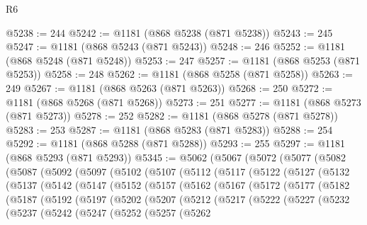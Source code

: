 \begin{lexlean}{R6}
\begin{coremodule}
@5238 := 244
@5242 := @1181 (@868 @5238 (@871 @5238))
@5243 := 245
@5247 := @1181 (@868 @5243 (@871 @5243))
@5248 := 246
@5252 := @1181 (@868 @5248 (@871 @5248))
@5253 := 247
@5257 := @1181 (@868 @5253 (@871 @5253))
@5258 := 248
@5262 := @1181 (@868 @5258 (@871 @5258))
@5263 := 249
@5267 := @1181 (@868 @5263 (@871 @5263))
@5268 := 250
@5272 := @1181 (@868 @5268 (@871 @5268))
@5273 := 251
@5277 := @1181 (@868 @5273 (@871 @5273))
@5278 := 252
@5282 := @1181 (@868 @5278 (@871 @5278))
@5283 := 253
@5287 := @1181 (@868 @5283 (@871 @5283))
@5288 := 254
@5292 := @1181 (@868 @5288 (@871 @5288))
@5293 := 255
@5297 := @1181 (@868 @5293 (@871 @5293))
@5345 := @5062
    (@5067
      (@5072
        (@5077
          (@5082
            (@5087
              (@5092
                (@5097
                  (@5102
                    (@5107
                      (@5112
                        (@5117
                          (@5122
                            (@5127
                              (@5132
                                (@5137
                                  (@5142
                                    (@5147
                                      (@5152
                                        (@5157
                                          (@5162
                                            (@5167
                                              (@5172
                                                (@5177
                                                  (@5182
                                                    (@5187
                                                      (@5192
                                                        (@5197
                                                          (@5202
                                                            (@5207
                                                              (@5212
                                                                (@5217
                                                                  (@5222
                                                                    (@5227
                                                                      (@5232
                                                                        (@5237
                                                                          (@5242
                                                                            (@5247
                                                                              (@5252
                                                                                (@5257
                                                                                  (@5262

\end{coremodule}
\end{lexlean}
